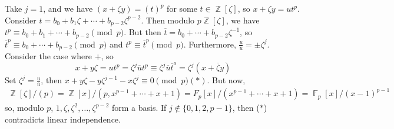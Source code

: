 \documentclass[11pt, a4paper]{memoir}
\DeclareMathOperator{\Z}{{\mathbb{Z}}}
\DeclareMathOperator{\F}{{\mathbb{F}}}
\newcommand{\ol}[1]{\ensuremath{\overline{#1}}}
\theoremstyle{change}
\theoremstyle{plain}
\theoremstyle{nonumberplain}
\numberwithin{equation}{section}
\begin{document}
Take $j=1$, and we have $(x+\zeta y)=(t)^p$ for some $t\in\Z[\zeta]$, so $x+\zeta y=ut^p$.
Consider $t=b_0+b_1\zeta+\cdots+b_{p-2}\zeta^{p-2}$.
Then modulo $p\Z[\zeta]$, we have $t^p\equiv b_0+b_1+\cdots+b_{p-2}\pmod{p}$.
But then $\ol{t}=b_0+\cdots+b_{p-2}\zeta^{-1}$, so $\ol{t}^p\equiv b_0+\cdots+b_{p-2}\pmod{p}$ and $t^p\equiv \ol{t}^p\pmod{p}$.
Furthermore, $\frac{u}{\ol{u}}=\pm\zeta^j$.
Consider the case where $+$, so
\begin{equation*}
    x+y\zeta=ut^p=\zeta^j\ol{u}t^p\equiv\zeta^j\ol{u}\ol{t}^o=\zeta^j(x+\ol{\zeta}y)
\end{equation*}
Set $\zeta^j=\frac{u}{\ol{u}}$, then $x+y\zeta-y\zeta^{j-1}-x\zeta^j\equiv 0\pmod{p} (*)$.
But now,
\begin{align*}
    \Z[\zeta]/(p) = \Z[x]/(p,x^{p-1}+\cdots+x+1) = F_p[x]/(x^{p-1}+\cdots+x+1)=\F_p[x]/(x-1)^{p-1}
\end{align*}
so, modulo $p$, $1,\zeta,\zeta^2,\ldots,\zeta^{p-2}$ form a basis.
If $j\notin\{0,1,2,p-1\}$, then ($*$) contradicts linear independence.
\end{document}
